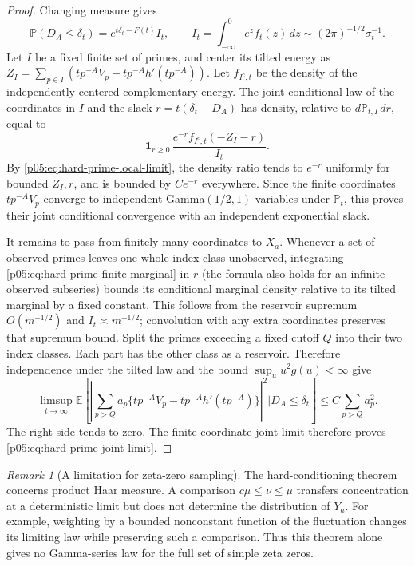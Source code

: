 \documentclass[11pt,letterpaper]{article}
\theoremstyle{definition}
\theoremstyle{remark}
\newtheorem{remark}[theorem]{Remark}
\newcommand{\1}{\mathbf 1}
\begin{document}
\begin{proof}
Changing measure gives
\[
 \mathbb P(D_A\le\delta_t)
 =e^{t\delta_t-F(t)}I_t,
 \qquad I_t=\int_{-\infty}^0e^z f_t(z)\,dz
 \sim(2\pi)^{-1/2}\sigma_t^{-1}.
\]
Let $I$ be a fixed finite set of primes, and center its tilted energy
as $Z_I=\sum_{p\in I}(tp^{-A}V_p-tp^{-A}h'(tp^{-A}))$.
Let $f_{I^c,t}$ be the density of the independently centered
complementary energy.  The joint conditional law of the coordinates
in $I$ and the slack $r=t(\delta_t-D_A)$ has density, relative to
$d\mathbb P_{t,I}\,dr$, equal to
\begin{equation}\label{p05:eq:hard-prime-finite-marginal}
 \mathbf1_{r\ge0}\,
 \frac{e^{-r}f_{I^c,t}(-Z_I-r)}{I_t}.
\end{equation}
By \eqref{p05:eq:hard-prime-local-limit}, the density ratio tends to
$e^{-r}$ uniformly for bounded $Z_I,r$, and is bounded by $Ce^{-r}$
everywhere.  Since the finite coordinates $tp^{-A}V_p$ converge to
independent Gamma$(1/2,1)$ variables under $\mathbb P_t$, this proves
their joint conditional convergence with an independent exponential
slack.

It remains to pass from finitely many coordinates to $X_a$.
Whenever a set of observed primes leaves one whole index class
unobserved, integrating \eqref{p05:eq:hard-prime-finite-marginal} in $r$
(the formula also holds for an infinite observed subseries) bounds
its conditional marginal density relative to its tilted marginal
by a fixed constant.  This follows from the reservoir supremum
$O(m^{-1/2})$ and $I_t\asymp m^{-1/2}$; convolution with any extra
coordinates preserves that supremum bound.
Split the primes exceeding a fixed cutoff $Q$ into their two index
classes.  Each part has the other class as a reservoir.  Therefore
independence under the tilted law and the bound
$\sup_u u^2g(u)<\infty$ give
\[
 \limsup_{t\to\infty}
 \mathbb E\left[
 \left|\sum_{p>Q}a_p\{tp^{-A}V_p-tp^{-A}h'(tp^{-A})\}\right|^2
 \mathrel{\Big|}D_A\le\delta_t\right]
 \le C\sum_{p>Q}a_p^2.
\]
The right side tends to zero.  The finite-coordinate joint limit
therefore proves \eqref{p05:eq:hard-prime-joint-limit}.
\end{proof}

\begin{remark}[A limitation for zeta-zero sampling]
The hard-conditioning theorem concerns product Haar measure.
A comparison $c\mu\le\nu\le\mu$ transfers concentration at a
deterministic limit but does not determine the distribution of
$Y_a$.  For example, weighting by a bounded nonconstant function
of the fluctuation changes its limiting law while preserving such
a comparison.  Thus this theorem alone gives no Gamma-series law
for the full set of simple zeta zeros.
\end{remark}
\end{document}
